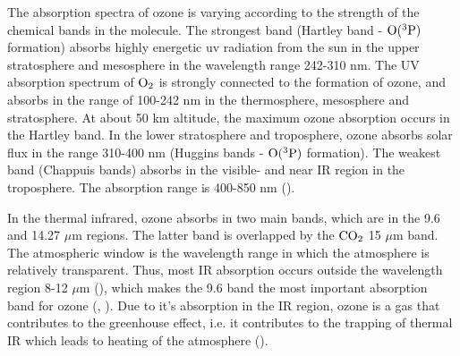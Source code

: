 \medskip

The absorption spectra of ozone is varying according to the strength of the chemical bands in the molecule. The strongest band (Hartley band - $\mathrm{O(^3P)}$ formation) absorbs highly energetic \acrfull{uv} radiation from the sun in the upper stratosphere and mesosphere in the wavelength range 242-310 nm. The UV absorption spectrum of $\mathrm{O_2}$ is strongly connected to the formation of ozone, and absorbs in the range of 100-242 nm in the thermosphere, mesosphere and stratosphere. At about 50 km altitude, the maximum ozone absorption occurs in the Hartley band. In the lower stratosphere and troposphere, ozone absorbs solar flux in the range 310-400 nm (Huggins bands - $\mathrm{O(^3P)}$ formation). The weakest band (Chappuis bands) absorbs in the visible- and near IR region in the troposphere. The absorption range is 400-850 nm (\cite{Liou_AtmRad}). 



\medskip 

In the thermal infrared, ozone absorbs in two main bands, which are in the 9.6 and 14.27 $\mu$m regions. The latter band is overlapped by the $\mathrm{CO_2}$ 15 $\mu$m band. The atmospheric window is the wavelength range in which the atmosphere is relatively transparent. Thus, most IR absorption occurs outside the wavelength region 8-12 $\mu$m (\cite{AtmModFund}), which makes the 9.6 band the most important absorption band for ozone (\cite{Liou_AtmRad}, \cite{Myhre1997}). Due to it's absorption in the IR region, ozone is a gas that contributes to the greenhouse effect, i.e. it contributes to the trapping of thermal IR which leads to heating of the atmosphere (\cite{Liou_AtmRad}).

\medskip




